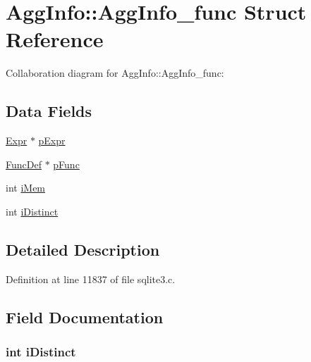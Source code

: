 \hypertarget{struct_agg_info_1_1_agg_info__func}{}\section{Agg\+Info\+:\+:Agg\+Info\+\_\+func Struct Reference}
\label{struct_agg_info_1_1_agg_info__func}


Collaboration diagram for Agg\+Info\+:\+:Agg\+Info\+\_\+func\+:
\subsection*{Data Fields}
\begin{DoxyCompactItemize}
\item 
\hyperlink{struct_expr}{Expr} $\ast$ \hyperlink{struct_agg_info_1_1_agg_info__func_aab4193f0accd02e4c2e5e60e105c03ca}{p\+Expr}
\item 
\hyperlink{struct_func_def}{Func\+Def} $\ast$ \hyperlink{struct_agg_info_1_1_agg_info__func_a3859b9ebe9b2002c8ffb62f1a52e5c4d}{p\+Func}
\item 
int \hyperlink{struct_agg_info_1_1_agg_info__func_a4148ebd0b3725e0aab563fee5e1c4082}{i\+Mem}
\item 
int \hyperlink{struct_agg_info_1_1_agg_info__func_a13337155c1f77c9fae31ca16a87d59a7}{i\+Distinct}
\end{DoxyCompactItemize}


\subsection{Detailed Description}


Definition at line 11837 of file sqlite3.\+c.



\subsection{Field Documentation}
\hypertarget{struct_agg_info_1_1_agg_info__func_a13337155c1f77c9fae31ca16a87d59a7}{}
\subsubsection[{i\+Distinct}]{\setlength{\rightskip}{0pt plus 5cm}int i\+Distinct}\label{struct_agg_info_1_1_agg_info__func_a13337155c1f77c9fae31ca16a87d59a7}


